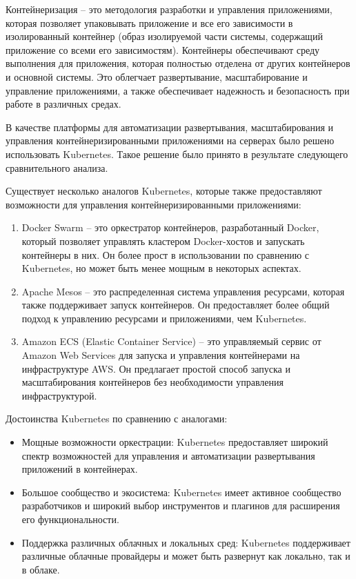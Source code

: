 Контейнеризация -- это методология разработки и управления приложениями, которая позволяет упаковывать приложение и все его зависимости в изолированный контейнер (образ изолируемой части системы, содержащий приложение со всеми его зависимостям). Контейнеры обеспечивают среду выполнения для приложения, которая полностью отделена от других контейнеров и основной системы. Это облегчает развертывание, масштабирование и управление приложениями, а также обеспечивает надежность и безопасность при работе в различных средах. 

В качестве платформы для автоматизации развертывания, масштабирования и управления контейнеризированными приложениями на серверах было решено использовать Kubernetes. Такое решение было принято в результате следующего сравнительного анализа.

Существует несколько аналогов Kubernetes, которые также предоставляют возможности для управления контейнеризированными приложениями:
\begin{enumerate}
    \item Docker Swarm -- это оркестратор контейнеров, разработанный Docker, который позволяет управлять кластером Docker-хостов и запускать контейнеры в них. Он более прост в использовании по сравнению с Kubernetes, но может быть менее мощным в некоторых аспектах.
    \item Apache Mesos -- это распределенная система управления ресурсами, которая также поддерживает запуск контейнеров. Он предоставляет более общий подход к управлению ресурсами и приложениями, чем Kubernetes.
    \item Amazon ECS (Elastic Container Service) -- это управляемый сервис от Amazon Web Services для запуска и управления контейнерами на инфраструктуре AWS. Он предлагает простой способ запуска и масштабирования контейнеров без необходимости управления инфраструктурой.
\end{enumerate}

Достоинства Kubernetes по сравнению с аналогами:
\begin{itemize}
    \item Мощные возможности оркестрации: Kubernetes предоставляет широкий спектр возможностей для управления и автоматизации развертывания приложений в контейнерах.
    \item Большое сообщество и экосистема: Kubernetes имеет активное сообщество разработчиков и широкий выбор инструментов и плагинов для расширения его функциональности.
    \item Поддержка различных облачных и локальных сред: Kubernetes поддерживает различные облачные провайдеры и может быть развернут как локально, так и в облаке.
\end{itemize}

